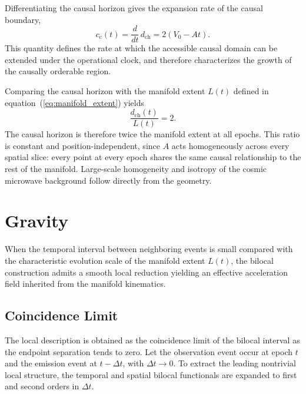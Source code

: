 \documentclass[fontsize=12pt, paper=a4]{scrartcl}
\begin{document}
Differentiating the causal horizon gives the expansion rate of the causal boundary,
\begin{equation}
c_{\mathrm{c}}(t)=\frac{d}{dt}\,d_{\mathrm{ch}}=2\left(V_0-At\right).
\end{equation}
This quantity defines the rate at which the accessible causal domain can be extended under the operational clock, and therefore characterizes the growth of the causally orderable region.

Comparing the causal horizon with the manifold extent $L(t)$ defined in equation~(\ref{eq:manifold_extent}) yields
\begin{equation}
\frac{d_{\mathrm{ch}}(t)}{L(t)} = 2 .
\end{equation}
The causal horizon is therefore twice the manifold extent at all epochs. This ratio is constant and position-independent, since $A$ acts homogeneously across every spatial slice: every point at every epoch shares the same causal relationship to the rest of the manifold. Large-scale homogeneity and isotropy of the cosmic microwave background follow directly from the geometry.

\section{Gravity}

When the temporal interval between neighboring events is small compared with the characteristic evolution scale of the manifold extent $L(t)$, the bilocal construction admits a smooth local reduction yielding an effective acceleration field inherited from the manifold kinematics.

\subsection{Coincidence Limit}

The local description is obtained as the coincidence limit of the bilocal interval as the endpoint separation tends to zero. Let the observation event occur at epoch $t$ and the emission event at $t-\Delta t$, with $\Delta t \to 0$. To extract the leading nontrivial local structure, the temporal and spatial bilocal functionals are expanded to first and second orders in $\Delta t$.
\end{document}
